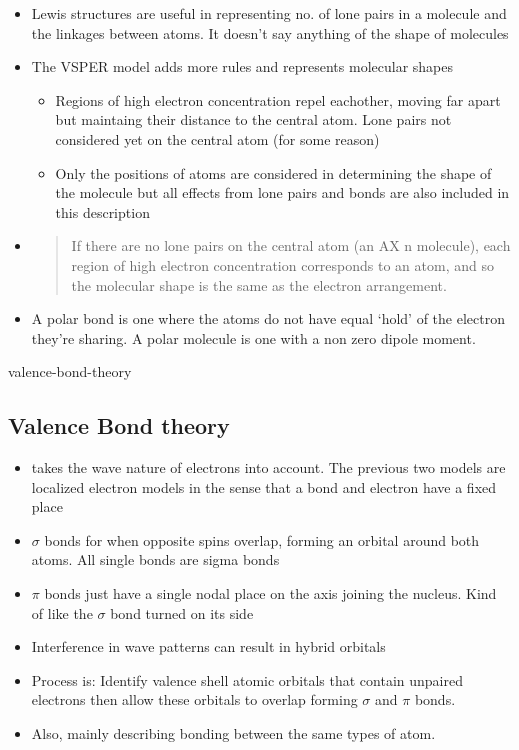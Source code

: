 \documentclass[12pt]{article}
\begin{document}
\begin{itemize}
\item
  Lewis structures are useful in representing no. of lone pairs in a
  molecule and the linkages between atoms. It doesn't say anything of
  the shape of molecules
\item
  The VSPER model adds more rules and represents molecular shapes

  \begin{itemize}
  \item
    Regions of high electron concentration repel eachother, moving far
    apart but maintaing their distance to the central atom. Lone pairs
    not considered yet on the central atom (for some reason)
  \item
    Only the positions of atoms are considered in determining the shape
    of the molecule but all effects from lone pairs and bonds are also
    included in this description
  \end{itemize}
\item
  \begin{quote}
  If there are no lone pairs on the central atom (an AX n molecule),
  each region of high electron concentration corresponds to an atom, and
  so the molecular shape is the same as the electron arrangement.
  \end{quote}
\item
  A polar bond is one where the atoms do not have equal `hold' of the
  electron they're sharing. A polar molecule is one with a non zero
  dipole moment.
\end{itemize}

 {valence-bond-theory}{%
\subsection{Valence Bond theory}\label{valence-bond-theory}}

\begin{itemize}
\item
  takes the wave nature of electrons into account. The previous two
  models are localized electron models in the sense that a bond and
  electron have a fixed place
\item
  \(\sigma\) bonds for when opposite spins overlap, forming an orbital
  around both atoms. All single bonds are sigma bonds
\item
  \(\pi\) bonds just have a single nodal place on the axis joining the
  nucleus. Kind of like the \(\sigma\) bond turned on its side
\item
  Interference in wave patterns can result in hybrid orbitals
\item
  Process is: Identify valence shell atomic orbitals that contain
  unpaired electrons then allow these orbitals to overlap forming
  \(\sigma\) and \(\pi\) bonds.
\item
  Also, mainly describing bonding between the same types of atom.
\end{itemize}
\end{document}
